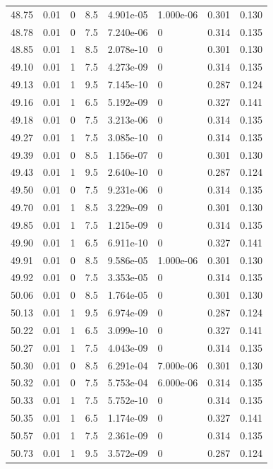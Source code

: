 \documentclass[preview]{standalone}
\begin{document}
{{{{{{{{{{{{{{\begin{tabular}{L{1.2cm}C{1.2cm} C{0.3cm}C{0.5cm} C{1.4cm}C{1.4cm} C{1.4cm}C{1.4cm}}
  48.75  &  0.01  & 0     & 8.5 &  4.901e-05  & 1.000e-06  & 0.301 &  0.130   \\ 
  48.78  &  0.01  & 0     & 7.5 &  7.240e-06  & 0  & 0.314 &  0.135   \\ 
  48.85  &  0.01  & 1     & 8.5 &  2.078e-10  & 0  & 0.301 &  0.130   \\ 
  49.10  &  0.01  & 1     & 7.5 &  4.273e-09  & 0  & 0.314 &  0.135   \\ 
  49.13  &  0.01  & 1     & 9.5 &  7.145e-10  & 0  & 0.287 &  0.124   \\ 
  49.16  &  0.01  & 1     & 6.5 &  5.192e-09  & 0  & 0.327 &  0.141   \\ 
  49.18  &  0.01  & 0     & 7.5 &  3.213e-06  & 0  & 0.314 &  0.135   \\ 
  49.27  &  0.01  & 1     & 7.5 &  3.085e-10  & 0  & 0.314 &  0.135   \\ 
  49.39  &  0.01  & 0     & 8.5 &  1.156e-07  & 0  & 0.301 &  0.130   \\ 
  49.43  &  0.01  & 1     & 9.5 &  2.640e-10  & 0  & 0.287 &  0.124   \\ 
  49.50  &  0.01  & 0     & 7.5 &  9.231e-06  & 0  & 0.314 &  0.135   \\ 
  49.70  &  0.01  & 1     & 8.5 &  3.229e-09  & 0  & 0.301 &  0.130   \\ 
  49.85  &  0.01  & 1     & 7.5 &  1.215e-09  & 0  & 0.314 &  0.135   \\ 
  49.90  &  0.01  & 1     & 6.5 &  6.911e-10  & 0  & 0.327 &  0.141   \\ 
  49.91  &  0.01  & 0     & 8.5 &  9.586e-05  & 1.000e-06  & 0.301 &  0.130   \\ 
  49.92  &  0.01  & 0     & 7.5 &  3.353e-05  & 0  & 0.314 &  0.135   \\ 
  50.06  &  0.01  & 0     & 8.5 &  1.764e-05  & 0  & 0.301 &  0.130   \\ 
  50.13  &  0.01  & 1     & 9.5 &  6.974e-09  & 0  & 0.287 &  0.124   \\ 
  50.22  &  0.01  & 1     & 6.5 &  3.099e-10  & 0  & 0.327 &  0.141   \\ 
  50.27  &  0.01  & 1     & 7.5 &  4.043e-09  & 0  & 0.314 &  0.135   \\ 
  50.30  &  0.01  & 0     & 8.5 &  6.291e-04  & 7.000e-06  & 0.301 &  0.130   \\ 
  50.32  &  0.01  & 0     & 7.5 &  5.753e-04  & 6.000e-06  & 0.314 &  0.135   \\ 
  50.33  &  0.01  & 1     & 7.5 &  5.752e-10  & 0  & 0.314 &  0.135   \\ 
  50.35  &  0.01  & 1     & 6.5 &  1.174e-09  & 0  & 0.327 &  0.141   \\ 
  50.57  &  0.01  & 1     & 7.5 &  2.361e-09  & 0  & 0.314 &  0.135   \\ 
  50.73  &  0.01  & 1     & 9.5 &  3.572e-09  & 0  & 0.287 &  0.124   \\ 
\hline 
\end{tabular} 

}}}}}}}}}}}}}}
\end{document}
